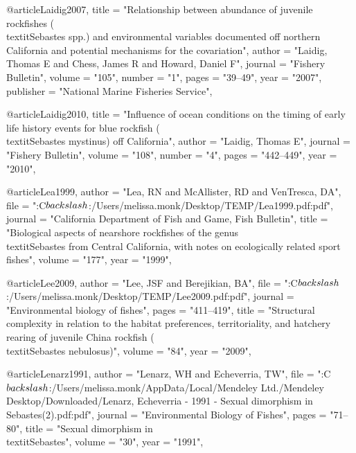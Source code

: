 @article{Laidig2007,
    title = "{Relationship between abundance of juvenile rockfishes (\\textit{{{Sebastes}}} spp.) and environmental variables documented off northern California and potential mechanisms for the covariation}",
    author = "{Laidig, Thomas E and Chess, James R and Howard, Daniel F}",
    journal = "{Fishery Bulletin}",
    volume = "{105}",
    number = "{1}",
    pages = "{39--49}",
    year = "{2007}",
    publisher = "{National Marine Fisheries Service}",
}

@article{Laidig2010,
    title = "{Influence of ocean conditions on the timing of early life history events for blue rockfish (\\textit{{{Sebastes}} mystinus}) off California}",
    author = "{Laidig, Thomas E}",
    journal = "{Fishery Bulletin}",
    volume = "{108}",
    number = "{4}",
    pages = "{442--449}",
    year = "{2010}",
}

@article{Lea1999,
    author = "{Lea, RN and McAllister, RD and VenTresca, DA}",
    file = "{:C$\\backslash$:/Users/melissa.monk/Desktop/TEMP/Lea1999.pdf:pdf}",
    journal = "{California Department of Fish and Game, Fish Bulletin}",
    title = "{{Biological aspects of nearshore rockfishes of the genus \\textit{{Sebastes}} from {Central} {California}, with notes on ecologically related sport fishes}}",
    volume = "{177}",
    year = "{1999}",
}

@article{Lee2009,
    author = "{Lee, JSF and Berejikian, BA}",
    file = "{:C$\\backslash$:/Users/melissa.monk/Desktop/TEMP/Lee2009.pdf:pdf}",
    journal = "{Environmental biology of fishes}",
    pages = "{411--419}",
    title = "{{Structural complexity in relation to the habitat preferences, territoriality, and hatchery rearing of juvenile China rockfish (\\textit{{Sebastes} nebulosus})}}",
    volume = "{84}",
    year = "{2009}",
}

@article{Lenarz1991,
    author = "{Lenarz, WH and Echeverria, TW}",
    file = "{:C$\\backslash$:/Users/melissa.monk/AppData/Local/Mendeley Ltd./Mendeley Desktop/Downloaded/Lenarz, Echeverria - 1991 - Sexual dimorphism in Sebastes(2).pdf:pdf}",
    journal = "{Environmental Biology of Fishes}",
    pages = "{71--80}",
    title = "{{Sexual dimorphism in \\textit{{Sebastes}}}}",
    volume = "{30}",
    year = "{1991}",
}

